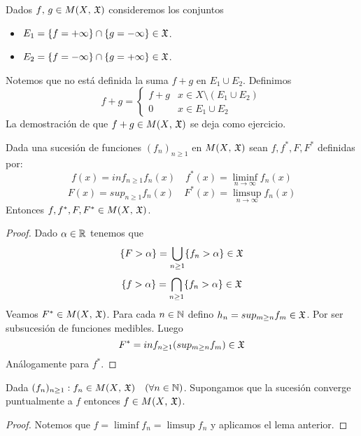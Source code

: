 \begin{note}
    Dados $f\text{, } g \in M(X\text{, } \mathfrak{X})$ consideremos los conjuntos \begin{itemize}
        \item $E_1 = \{ f = + \infty \} \cap \{ g = - \infty \} \in \mathfrak{X}$.
        \item $E_2 = \{ f = - \infty \} \cap \{ g = + \infty \} \in \mathfrak{X}$.
    \end{itemize}
    Notemos que no está definida la suma $f + g$ en $E_1 \cup E_2$.
    Definimos \begin{equation*}
        f+g = \begin{cases}
            f+g & x \in X \setminus (E_1 \cup E_2) \\
            0   & x \in E_1 \cup E_2
        \end{cases}
    \end{equation*}
    La demostración de que $f+g \in M(X\text{, } \mathfrak{X})$ se deja como ejercicio.
\end{note}

\begin{lemma}
    Dada una sucesión de funciones $(f_n)_{n \geq 1}$ en $M(X\text{, } \mathfrak{X})$ sean $f, f^*, F, F^*$ definidas por:
    \begin{equation*}
        f(x) = inf_{n \geq 1} f_n(x) \quad f^*(x) = \liminf_{n \to \infty} f_n(x)
    \end{equation*}
    \begin{equation*}
        F(x) = sup_{n \geq 1} f_n(x) \quad F^*(x) = \limsup_{n \to \infty} f_n(x)
    \end{equation*}
    Entonces $f, f^*, F, F^* \in M(X\text{, } \mathfrak{X})$.
    \begin{proof}
        Dado $\alpha \in \mathbb{R}$ tenemos que \begin{equation*}
            \{ F > \alpha \} = \bigcup_{n \geq 1} \{ f_n > \alpha \} \in \mathfrak{X}
        \end{equation*}
        \begin{equation*}
            \{ f > \alpha \} = \bigcap_{n \geq 1} \{ f_n > \alpha \} \in \mathfrak{X}
        \end{equation*}
        Veamos $F^* \in M(X\text{, } \mathfrak{X})$. Para cada $n \in \mathbb{N}$ defino $h_n = sup_{m \geq n} f_m \in \mathfrak{X}$. Por ser subsucesión de funciones medibles.
        Luego \begin{equation*}
            F^* = inf_{n \geq 1} (sup_{m \geq n} f_m) \in \mathfrak{X}
        \end{equation*}
        Análogamente para $f^*$.
    \end{proof}
\end{lemma}

\begin{corollary}
    Dada $(f_n)_{n \geq 1} : f_n \in M(X\text{, } \mathfrak{X}) \quad (\forall n \in \mathbb{N})$. Supongamos que la sucesión converge puntualmente a $f$ entonces $f \in M(X\text{, } \mathfrak{X})$.
    \begin{proof}
        Notemos que $f = \liminf f_n = \limsup f_n$ y aplicamos el lema anterior.
    \end{proof}
\end{corollary}